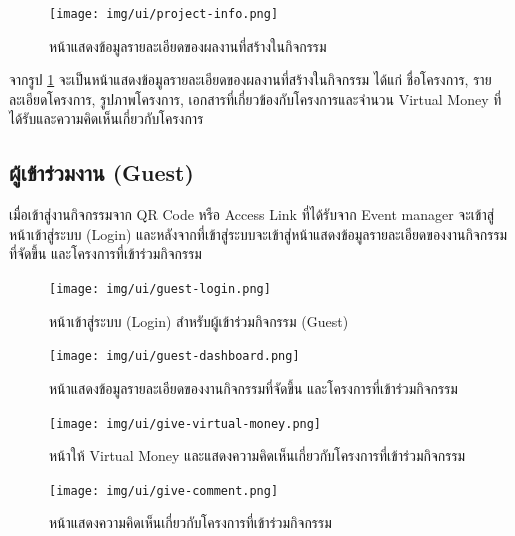 \clearpage
\begin{figure}[ht]
    \begin{center}
        \texttt{[image: img/ui/project-info.png]}
    \end{center}
    \caption{หน้าแสดงข้อมูลรายละเอียดของผลงานที่สร้างในกิจกรรม}
    \label{fig:project-info}
\end{figure}
จากรูป \ref{fig:project-info} จะเป็นหน้าแสดงข้อมูลรายละเอียดของผลงานที่สร้างในกิจกรรม ได้แก่ ชื่อโครงการ, รายละเอียดโครงการ, รูปภาพโครงการ, เอกสารที่เกี่ยวข้องกับโครงการและจำนวน Virtual Money ที่ได้รับและความคิดเห็นเกี่ยวกับโครงการ
\clearpage %

\subsection{ผู้เข้าร่วมงาน (Guest)}
เมื่อเข้าสู่งานกิจกรรมจาก QR Code หรือ Access Link ที่ได้รับจาก Event manager จะเข้าสู่หน้าเข้าสู่ระบบ (Login) และหลังจากที่เข้าสู่ระบบจะเข้าสู่หน้าแสดงข้อมูลรายละเอียดของงานกิจกรรมที่จัดขึ้น และโครงการที่เข้าร่วมกิจกรรม
\begin{figure}[h]
    \begin{center}
        \texttt{[image: img/ui/guest-login.png]}
    \end{center}
    \caption{หน้าเข้าสู่ระบบ (Login) สำหรับผู้เข้าร่วมกิจกรรม (Guest)}
    \label{fig:guest-dashboard}

    \begin{center}
        \texttt{[image: img/ui/guest-dashboard.png]}
    \end{center}
    \caption{หน้าแสดงข้อมูลรายละเอียดของงานกิจกรรมที่จัดขึ้น และโครงการที่เข้าร่วมกิจกรรม}
    \label{fig:guest-dashboard}
\end{figure}

\begin{figure}
    \begin{center}
        \texttt{[image: img/ui/give-virtual-money.png]}
    \end{center}
    \caption{หน้าให้ Virtual Money และแสดงความคิดเห็นเกี่ยวกับโครงการที่เข้าร่วมกิจกรรม}
    \label{fig:guest-project-info}

    \begin{center}
        \texttt{[image: img/ui/give-comment.png]}
    \end{center}
    \caption{หน้าแสดงความคิดเห็นเกี่ยวกับโครงการที่เข้าร่วมกิจกรรม}
    \label{fig:give-comment}
\end{figure}